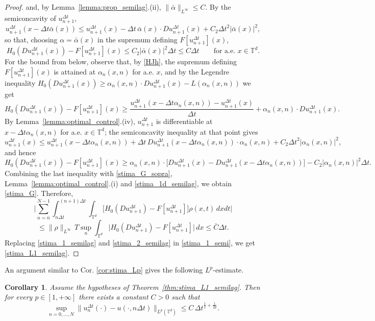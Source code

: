 \documentclass[11pt]{amsart}
\newtheorem{cor}[thm]{Corollary}
\theoremstyle{remark}
\theoremstyle{definition}
\theoremstyle{Claim}
\newcommand{\T}{{\mathbb{T}}}
\theoremstyle{plain}
\newcommand{\dt}{{\Delta t}}
\begin{document}
\begin{proof}
and, by Lemma~\ref{lemma:prop_semilag}.(ii),
$\|\bar\alpha\|_{L^\infty}\le C$. By the semiconcavity of $u^\dt_{n+1}$,
\[
	u^\dt_{n+1}(x-\dt\bar\alpha(x))\le u^\dt_{n+1}(x)
	-\dt\,\bar\alpha(x)\cdot Du^\dt_{n+1}(x)+C_2\dt^2|\bar\alpha(x)|^2 ,
\]
so that, choosing $\alpha=\bar\alpha(x)$ in the supremum defining
$F[u^\dt_{n+1}](x)$,
\begin{equation}\label{stima_G_sopra}
	H_0(Du^\dt_{n+1}(x))-F[u^\dt_{n+1}](x)\le C_2|\bar\alpha(x)|^2\dt\le C\dt
	\qquad\text{for a.e. }x\in\T^d .
\end{equation}
For the bound from below, observe that, by \eqref{HJh}, the supremum defining
$F[u^\dt_{n+1}](x)$ is attained at $\alpha_n(x,n)$ for a.e. $x$, and by the
Legendre inequality
$H_0(Du^\dt_{n+1}(x))\ge \alpha_n(x,n)\cdot Du^\dt_{n+1}(x)-L(\alpha_n(x,n))$ we
get
\[
	H_0(Du^\dt_{n+1}(x))-F[u^\dt_{n+1}](x)\ge
	\frac{u^\dt_{n+1}(x-\dt\alpha_n(x,n))-u^\dt_{n+1}(x)}{\dt}
	+\alpha_n(x,n)\cdot Du^\dt_{n+1}(x) .
\]
By Lemma~\ref{lemma:optimal_control}.(iv), $u^\dt_{n+1}$ is differentiable at
$x-\dt\alpha_n(x,n)$ for a.e. $x\in\T^d$; the semiconcavity inequality at that
point gives
\[
	u^\dt_{n+1}(x)\le u^\dt_{n+1}(x-\dt\alpha_n(x,n))
	+\dt\, Du^\dt_{n+1}(x-\dt\alpha_n(x,n))\cdot\alpha_n(x,n)
	+C_2\dt^2|\alpha_n(x,n)|^2 ,
\]
and hence
\[
	H_0(Du^\dt_{n+1}(x))-F[u^\dt_{n+1}](x)\ge
	\alpha_n(x,n)\cdot\big[Du^\dt_{n+1}(x)-Du^\dt_{n+1}(x-\dt\alpha_n(x,n))\big]
	-C_2|\alpha_n(x,n)|^2\dt .
\]
Combining the last inequality with \eqref{stima_G_sopra},
Lemma~\ref{lemma:optimal_control}.(i) and \eqref{stima_1d_semilag}, we obtain
\eqref{stima_G}. Therefore,
\[
	\Big|\sum_{n=\bar n}^{N-1}\int_{n\dt}^{(n+1)\dt}\int_{\T^d}
	\Big[H_{0}(Du^\dt_{n+1})-F[u^\dt_{n+1}]\Big]\rho(x,t)\, dxdt\Big|\]
\begin{equation}\label{stima_2_semilag}
	\le \|\rho\|_{L^{\infty}}\, T \sup_{n}\int_{\T^d}
	\bigl|H_0(Du^\dt_{n+1})-F[u^\dt_{n+1}]\bigr|\,dx
	\le \bar C\dt .
\end{equation}
Replacing \eqref{stima_1_semilag} and \eqref{stima_2_semilag} in
\eqref{stima_1_semi}, we get \eqref{stima_L1_semilag}.

\end{proof}
An argument similar to Cor. \ref{cor:stima_Lp} gives the following $L^p$-estimate.
\begin{cor}\label{cor:stima_Lp_semilag}
Assume the hypotheses of Theorem~\ref{thm:stima_L1_semilag}. Then for every $p\in [1,+\infty]$ there exists a constant $C>0$ such that
\[
\sup_{n=0,\dots,N}\big\| u_n^\dt(\cdot)-u(\cdot,n\Delta t)\big\|_{L^p(\T^d)}
\le C\,\dt^{\frac12+\frac{1}{2p}}.
\]
\end{cor}
\end{document}
